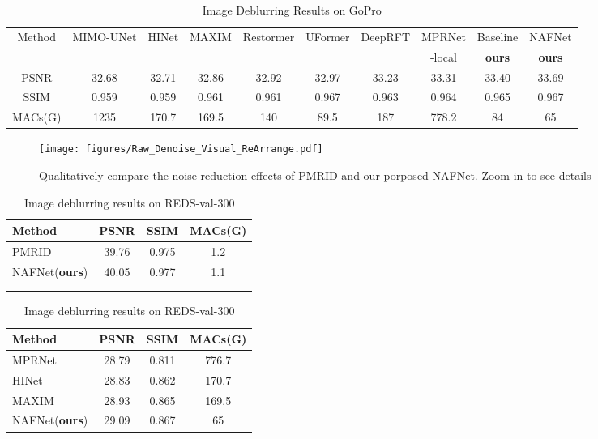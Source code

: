 \documentclass[runningheads]{llncs}
\begin{document}
\begin{table}
\scriptsize
\begin{center}
\caption{Image Deblurring Results on GoPro\cite{nah2017deep}}
\label{tab:SOTAs-on-GoPro}
\begin{tabular}{c|ccccccc|cc}
\hline
\multirow{2}{*}{Method} & MIMO-UNet & HINet & MAXIM & Restormer &  UFormer & DeepRFT & MPRNet & Baseline & NAFNet \\
                        & \cite{cho2021rethinking} & \cite{chen2021hinet} & \cite{tu2022maxim} & \cite{zamir2021restormer} & \cite{wang2021uformer} & \cite{mao2021deep} & -local\cite{chu2021revisiting}  & \textbf{ours} & \textbf{ours} \\
\hline
PSNR & 32.68 & 32.71 & 32.86 & 32.92 & 32.97 & 33.23 & 33.31 & 33.40 & 33.69 \\
SSIM & 0.959 & 0.959 & 0.961 & 0.961 & 0.967 & 0.963 & 0.964 & 0.965 & 0.967 \\
\hline
MACs(G) & 1235 & 170.7 & 169.5 & 140 & 89.5 & 187 & 778.2 & 84 & 65 \\
\hline
\end{tabular}
\end{center}

\end{table}
\begin{figure*}[!t]
\texttt{[image: figures/Raw\_Denoise\_Visual\_ReArrange.pdf]}
\caption{Qualitatively compare the noise reduction effects of PMRID\cite{wang2020practical} and our porposed NAFNet. Zoom in to see details}
\label{fig:Raw-Denoise-Visual}
\end{figure*}
\begin{table}[ht]
\RawFloats
\scriptsize
\setlength{\tabcolsep}{3pt}
    \parbox{.48\linewidth}{
\centering
\caption{Raw image denoising results on 4Scenes\cite{wang2020practical}
}
 \label{tab:SOTA.raw-denoise}
    \begin{tabular}{lccc}
{Method} & {PSNR}  & {SSIM} &{MACs(G)}  \\ 
\hline
PMRID\cite{wang2020practical} & 39.76 & 0.975 & 1.2  \\
{NAFNet(\textbf{ours})}  & 40.05&{0.977} & {1.1}\\ 
\hline
& & & \\
& & & 
\end{tabular}}
\hfill    
\parbox{.48\linewidth}{
\centering
\caption{Image deblurring results on REDS-val-300\cite{nah2021ntire}
}
 \label{tab:SOTA.REDS-val-300}

\begin{tabular}{lccc}
{Method} & {PSNR}  & {SSIM} & MACs(G)\\
\hline
 MPRNet\cite{waqas2021multi} & 28.79 & 0.811 & 776.7 \\
 HINet\cite{chen2021hinet} & 28.83 & 0.862 & 170.7 \\
 MAXIM\cite{tu2022maxim} & 28.93 & 0.865 & 169.5\\
 \hline
{NAFNet(\textbf{ours})}  & 29.09 & 0.867 & 65 \\
\hline      

\end{tabular}
}
\end{table}
\end{document}
